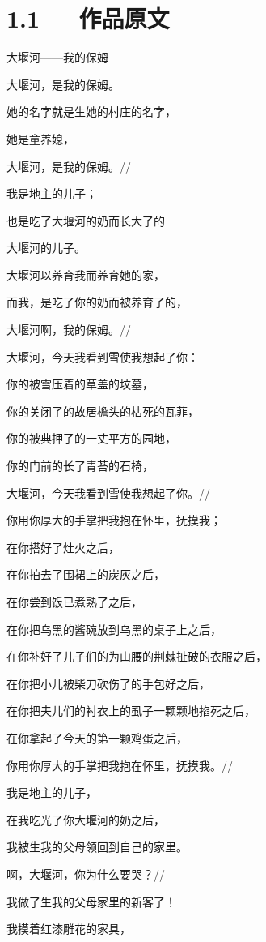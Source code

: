 \documentclass[letterpaper,10pt,english]{sphinxmanual}
\begin{document}
\section{1.1   作品原文}
\label{\detokenize{p01_u6563_u6587/_u827e_u9752-_u5927_u5830_u6cb3_u2014_u2014_u6211_u7684_u4fdd_u59c6:id3}}
大堰河——我的保姆

大堰河，是我的保姆。

她的名字就是生她的村庄的名字，

她是童养媳，

大堰河，是我的保姆。//

我是地主的儿子；

也是吃了大堰河的奶而长大了的

大堰河的儿子。

大堰河以养育我而养育她的家，

而我，是吃了你的奶而被养育了的，

大堰河啊，我的保姆。//

大堰河，今天我看到雪使我想起了你：

你的被雪压着的草盖的坟墓，

你的关闭了的故居檐头的枯死的瓦菲，

你的被典押了的一丈平方的园地，

你的门前的长了青苔的石椅，

大堰河，今天我看到雪使我想起了你。//

你用你厚大的手掌把我抱在怀里，抚摸我；

在你搭好了灶火之后，

在你拍去了围裙上的炭灰之后，

在你尝到饭已煮熟了之后，

在你把乌黑的酱碗放到乌黑的桌子上之后，

在你补好了儿子们的为山腰的荆棘扯破的衣服之后，

在你把小儿被柴刀砍伤了的手包好之后，

在你把夫儿们的衬衣上的虱子一颗颗地掐死之后，

在你拿起了今天的第一颗鸡蛋之后，

你用你厚大的手掌把我抱在怀里，抚摸我。//

我是地主的儿子，

在我吃光了你大堰河的奶之后，

我被生我的父母领回到自己的家里。

啊，大堰河，你为什么要哭？//

我做了生我的父母家里的新客了！

我摸着红漆雕花的家具，
\end{document}
